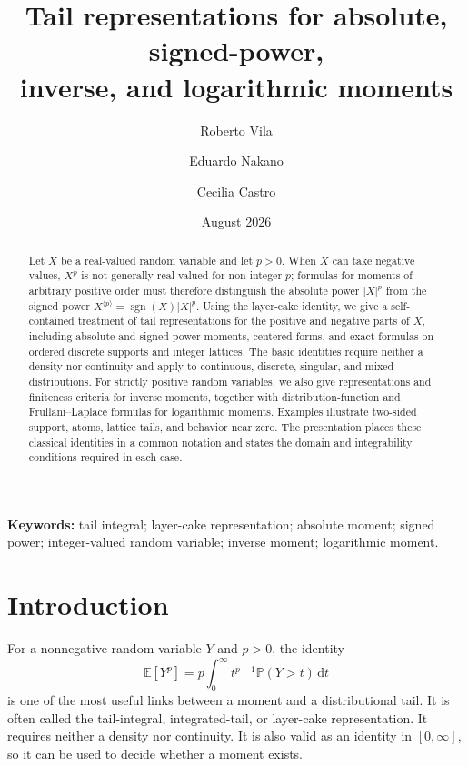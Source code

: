 \documentclass[11pt]{article}
\title{Tail representations for absolute, signed-power,\\
  inverse, and logarithmic moments}
\author[1,*]{Roberto Vila}
\author[1]{Eduardo Nakano}
\author[2]{Cecilia Castro}
\affil[1]{Department of Statistics, University of Bras\'ilia, Bras\'ilia, Brazil}
\affil[2]{Centre of Mathematics, Universidade do Minho, Braga, Portugal}
\date{August 2026}
\theoremstyle{definition}
\theoremstyle{remark}
\newcommand{\E}{\mathbb{E}}
\newcommand{\Pp}{\mathbb{P}}
\newcommand{\sgn}{\operatorname{sgn}}
\newcommand{\dd}{\,\mathrm{d}}
\newcommand{\abs}[1]{\left\lvert #1\right\rvert}
\newcommand{\spow}[2]{#1^{\langle #2\rangle}}
\begin{document}
\maketitle
\begingroup
\renewcommand{\thefootnote}{\fnsymbol{footnote}}
\endgroup

\begin{abstract}
Let $X$ be a real-valued random variable and let $p>0$.  When $X$ can take
negative values, $X^p$ is not generally real-valued for non-integer $p$;
formulas for moments of arbitrary positive order must therefore distinguish
the absolute power
$\abs{X}^p$ from the signed power $\spow{X}{p}=\sgn(X)\abs{X}^p$.
Using the layer-cake identity, we give a self-contained treatment of tail
representations for the positive and negative parts of $X$, including
absolute and signed-power moments, centered forms, and exact formulas on
ordered discrete supports and integer lattices.  The basic identities require
neither a density nor continuity and apply to continuous, discrete, singular,
and mixed distributions.  For strictly positive random variables, we also
give representations and finiteness criteria for inverse moments, together
with distribution-function and Frullani--Laplace formulas for logarithmic
moments.  Examples illustrate two-sided support, atoms, lattice tails, and
behavior near zero.  The presentation places these classical identities in a
common notation and states the domain and integrability conditions required
in each case.
\end{abstract}

\noindent\textbf{Keywords:}
tail integral; layer-cake representation; absolute moment; signed power;
integer-valued random variable; inverse moment; logarithmic moment.

\section{Introduction}

For a nonnegative random variable $Y$ and $p>0$, the identity
\begin{equation}\label{eq:classical-tail}
  \E[Y^p]
  =p\int_0^\infty t^{p-1}\Pp(Y>t)\dd t
\end{equation}
is one of the most useful links between a moment and a distributional tail.
It is often called the tail-integral, integrated-tail, or layer-cake
representation.  It requires neither a density nor continuity.  It is also
valid as an identity in $[0,\infty]$, so it can be used to decide whether a
moment exists.
\end{document}
